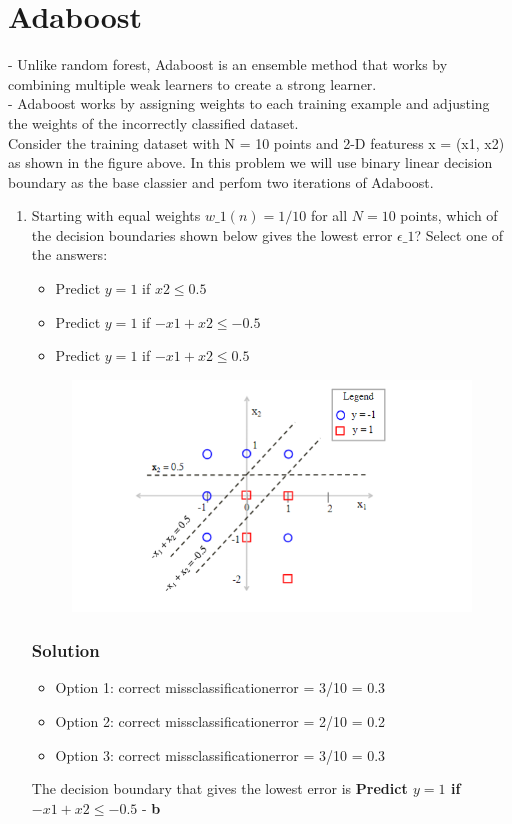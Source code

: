 \documentclass{article}
\begin{document}
\clearpage

\section{Adaboost}
- Unlike random forest, Adaboost is an ensemble method that works by combining multiple weak learners to create a strong learner.\\
- Adaboost works by assigning weights to each training example and adjusting the weights of the incorrectly classified dataset.\\
Consider the training dataset with N = 10 points and 2-D featuress x = (x1, x2) as shown in the figure above. In this problem we will use binary
linear decision boundary as the base classier and perfom two iterations of Adaboost.\\
\begin{enumerate}[label=\alph*)]
   \item Starting with equal weights \(w\_1(n) = 1/10\) for all \(N = 10\) points, which of the decision boundaries shown below gives the lowest error \(\epsilon\_1\)?
   Select one of the answers:
   \begin{itemize}
      \item Predict \(y = 1\) if \(x2 \leq 0.5\)
      \item Predict \(y = 1\) if \(-x1 + x2 \leq -0.5\)
      \item Predict \(y = 1\) if \(-x1 + x2 \leq 0.5\)
   \end{itemize}
   \begin{figure}[H]
      \centering
      \includegraphics[width=1\linewidth]{image.png}
  \end{figure}
   \subsubsection*{Solution}
   \begin{itemize}
      \item Option 1: correct missclassification{error} = 3/10 = 0.3
      \item Option 2: correct missclassification{error} = 2/10 = 0.2
      \item Option 3: correct missclassification{error} = 3/10 = 0.3
   \end{itemize}
   The decision boundary that gives the lowest error is \textbf{Predict \(y = 1\) if \(-x1 + x2 \leq -0.5\)} - 
   \textbf{b}


\end{enumerate}
\end{document}
